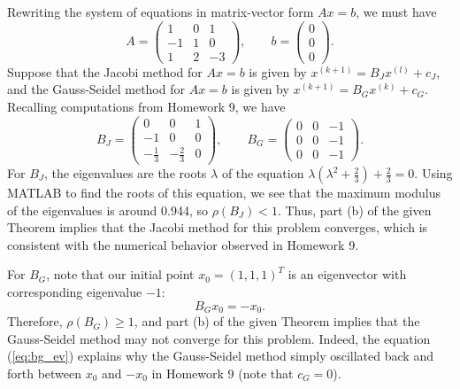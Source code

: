 \documentclass{homework}
\begin{document}
	\question
	Rewriting the system of equations in matrix-vector form $Ax = b$, we must have
	\begin{equation}
		A = \left(\begin{matrix}
			1 & 0 & 1\\
			-1 & 1 & 0 \\
			1 & 2 & -3
		\end{matrix}\right), \qquad b = \left(\begin{matrix}
			0 \\ 0 \\ 0
		\end{matrix}\right).
	\end{equation}
	Suppose that the Jacobi method for $Ax = b$ is given by $x^{(k+1)} = B_Jx^{(l)} + c_J$, and the Gauss-Seidel method for $Ax=b$ is given by $x^{(k+1)}=B_Gx^{(k)} + c_G$. Recalling computations from Homework 9, we have
	\begin{equation}
		B_J = \left(\begin{matrix}
			0 & 0 & 1\\
			-1 &0 & 0\\
			-\frac{1}{3} & -\frac{2}{3} & 0
		\end{matrix}\right),\qquad
		B_G = \left(\begin{matrix}
			0 & 0 & -1\\
			0 & 0 & -1\\
			0 & 0 & -1
		\end{matrix}\right).
	\end{equation}
	For $B_J$, the eigenvalues are the roots $\lambda$ of the equation $\lambda\left(\lambda^2 +\frac{2}{3}\right) + \frac{2}{3} = 0$. Using MATLAB to find the roots of this equation, we see that the maximum modulus of the eigenvalues is around 0.944, so $\rho(B_J) < 1$. Thus, part (b) of the given Theorem implies that the Jacobi method for this problem converges, which is consistent with the numerical behavior observed in Homework 9.
	
	For $B_G$, note that our initial point $x_0 = (1,1,1)^T$ is an eigenvector with corresponding eigenvalue $-1$:
	\begin{equation}
		\label{eq:bg_ev}
		B_Gx_0 = -x_0.
	\end{equation}
	Therefore, $\rho(B_G) \ge 1$, and part (b) of the given Theorem implies that the Gauss-Seidel method may not converge for this problem. Indeed, the equation (\ref{eq:bg_ev}) explains why the Gauss-Seidel method simply oscillated back and forth between $x_0$ and $-x_0$ in Homework 9 (note that $c_G = 0$).
\end{document}
